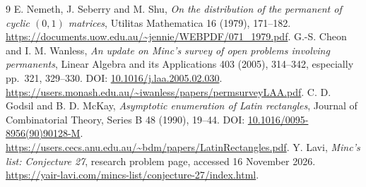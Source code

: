 \documentclass[11pt,a4paper]{article}
\begin{document}
\begin{thebibliography}{9}
 E. Nemeth, J. Seberry and M. Shu, \emph{On the distribution of the permanent of cyclic $(0,1)$ matrices}, Utilitas Mathematica 16 (1979), 171--182.\newline
\url{https://documents.uow.edu.au/~jennie/WEBPDF/071_1979.pdf}.
 G.-S. Cheon and I. M. Wanless, \emph{An update on Minc's survey of open problems involving permanents}, Linear Algebra and its Applications 403 (2005), 314--342, especially pp.~321, 329--330. DOI: \href{https://doi.org/10.1016/j.laa.2005.02.030}{10.1016/j.laa.2005.02.030}.\newline
\url{https://users.monash.edu.au/~iwanless/papers/permsurveyLAA.pdf}.
 C. D. Godsil and B. D. McKay, \emph{Asymptotic enumeration of Latin rectangles}, Journal of Combinatorial Theory, Series B 48 (1990), 19--44. DOI: \href{https://doi.org/10.1016/0095-8956(90)90128-M}{10.1016/0095-8956(90)90128-M}.\newline
\url{https://users.cecs.anu.edu.au/~bdm/papers/LatinRectangles.pdf}.
 Y. Lavi, \emph{Minc's list: Conjecture 27}, research problem page, accessed 16 November 2026.\newline
\url{https://yair-lavi.com/mincs-list/conjecture-27/index.html}.
\end{thebibliography}
\end{document}
